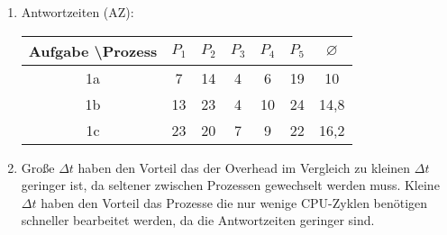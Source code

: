 \documentclass[ngerman]{fbi-aufgabenblatt}
\begin{document}
\begin{enumerate}
\begin{blockgraph}{31}{1}{0.4}
\end{blockgraph}

\item Antwortzeiten (AZ): \\
 \begin{tabular}{c||c|c|c|c|c|c}
  Aufgabe \textbackslash Prozess & $P_1$ & $P_2$ & $P_3$ & $P_4$ & $P_5$ & $\varnothing$ \\\hline\hline
    1a 				&  7   & 14 & 4 & 6  & 19 & 10 \\\hline
    1b 				&  13  & 23 & 4 & 10 & 24 & 14,8 \\\hline
    1c 				&  23  & 20 & 7 & 9  & 22 & 16,2 \\\hline
 \end{tabular}

\item Große $\Delta t$ haben den Vorteil das der Overhead im Vergleich zu
kleinen $\Delta t$ geringer ist, da seltener zwischen Prozessen gewechselt werden muss.
Kleine $\Delta t$ haben den Vorteil das Prozesse die nur wenige CPU-Zyklen benötigen
schneller bearbeitet werden, da die Antwortzeiten geringer sind.

\end{enumerate}

\end{document}
